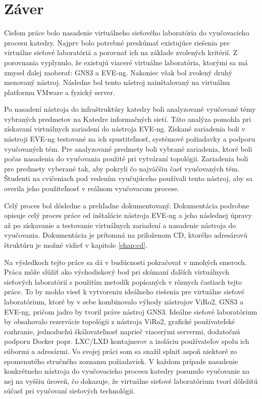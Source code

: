 \chapter{Záver}

Cieľom práce bolo nasadenie virtuálneho sieťového laboratória do vyučovacieho procesu katedry. Najprv bolo potrebné preskúmať existujúce riešenia pre virtuálne sieťové laboratóriá a porovnať ich na základe zvolených kritérií. Z porovnania vyplynulo, že existujú viaceré virtuálne laboratória, ktorými sa má zmysel ďalej zaoberať: GNS3 a EVE-ng. Nakoniec však bol zvolený druhý menovaný nástroj. Následne bol tento nástroj nainštalovaný na virtuálnu platformu VMware a fyzický server.

Po nasadení nástroja do infraštruktúry katedry boli analyzované vyučované témy vybraných predmetov na Katedre informačných sietí. Táto analýza pomohla pri získavaní virtuálnych zariadení do nástroja EVE-ng. Získané zariadenia boli v nástroji EVE-ng testované na ich spustiteľnosť, systémové požiadavky a podporu vyučovaných tém. Pre analyzované predmety boli vybrané zariadenia, ktoré boli počas nasadenia do vyučovania použité pri vytváraní topológii. Zariadenia boli pre predmety vyberané tak, aby pokryli čo najväčšiu časť vyučovaných tém. Študenti na cvičeniach pod vedením vyučujúceho používali tento nástroj, aby sa overila jeho použiteľnosť v reálnom vyučovacom procese.

Celý proces bol dôsledne a prehľadne dokumentovaný. Dokumentácia podrobne opisuje celý proces práce od inštalácie nástroja EVE-ng a jeho následnej úpravy až po získavanie a testovanie virtuálnych zariadení a nasadenie nástroja do vyučovania. Dokumentácia je prítomná na priloženom CD, ktorého adresárovú štruktúru je možné vidieť v kapitole \ref{chap:cd}.

Na výsledkoch tejto práce sa dá v budúcnosti pokračovať v mnohých smeroch. Práca môže slúžiť ako východiskový bod pri skúmaní ďalších virtuálnych sieťových laboratórií s použitím metodík popísaných v rôznych častiach tejto práce. To by mohlo viesť k vytvoreniu ideálneho riešenia pre virtuálne sieťové laboratórium, ktoré by v sebe kombinovalo výhody nástrojov ViRo2, GNS3 a EVE-ng, pričom jadro by tvoril práve nástroj GNS3. Ideálne sieťové laboratórium by obsahovalo rezervácie topológii z nástroja ViRo2, grafické používateľské rozhranie, jednoduchú škálovateľnosť naprieč viacerými servermi, dodatočnú podporu Docker popr. LXC/LXD kontajnerov a izoláciu používateľov spolu ich súbormi a adresármi. Vo svojej práci som sa snažil splniť aspoň niektoré zo spomenutého stručného zoznamu požiadaviek. V každom prípade nasadenie konkrétneho nástroja do vyučovacieho procesu katedry posunulo vyučovanie na nej na vyššiu úroveň, čo dokazuje, že virtuálne sieťové laboratórium tvorí dôležitú súčasť pri vyučovaní sieťových technológii.